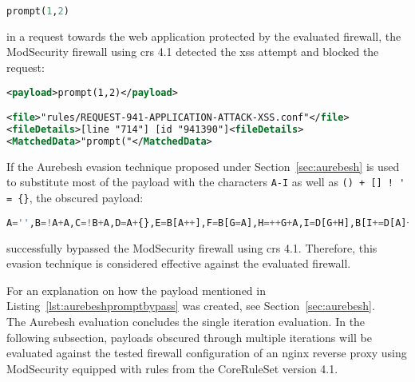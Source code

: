 \begin{lstlisting}[style=basicStyle, language=Python]
prompt(1,2)
\end{lstlisting}

in a request towards the web application protected by the evaluated firewall, the ModSecurity firewall using \acrshort{crs} 4.1 detected the \acrshort{xss} attempt and blocked the request:

\begin{lstlisting}[style=ruleStyle, language=XML, caption={prompt(1,2) blocked}, label=lst:promptblocked]
<payload>prompt(1,2)</payload>

<file>"rules/REQUEST-941-APPLICATION-ATTACK-XSS.conf"</file>
<fileDetails>[line "714"] [id "941390"]<fileDetails>
<MatchedData>"prompt("</MatchedData>
\end{lstlisting}

If the Aurebesh evasion technique proposed under Section~\ref{sec:aurebesh} is used to substitute most of the payload with the characters \verb|A-I| as well as \verb|() + [] ! ' = {}|, the obscured payload: 

\begin{lstlisting}[style=basicStyle, language=Python, caption={prompt(1,2) in Aurebesh.js bypass}, label={lst:aurebeshpromptbypass}]
A='',B=!A+A,C=!B+A,D=A+{},E=B[A++],F=B[G=A],H=++G+A,I=D[G+H],B[I+=D[A]+(B.C+D)[A]+C[H]+E+F+B[G]+I+E+D[A]+F][I]('p'+F+D[A]+'m'+'p'+E+'(A,++A)')()
\end{lstlisting}

successfully bypassed the ModSecurity firewall using \acrshort{crs} 4.1. Therefore, this evasion technique is considered effective against the evaluated firewall.

For an explanation on how the payload mentioned in Listing~\ref{lst:aurebeshpromptbypass} was created, see Section~\ref{sec:aurebesh}. \\

The Aurebesh evaluation concludes the single iteration evaluation. In the following subsection, payloads obscured through multiple iterations will be evaluated against the tested firewall configuration of an nginx reverse proxy using ModSecurity equipped with rules from the CoreRuleSet version 4.1.
